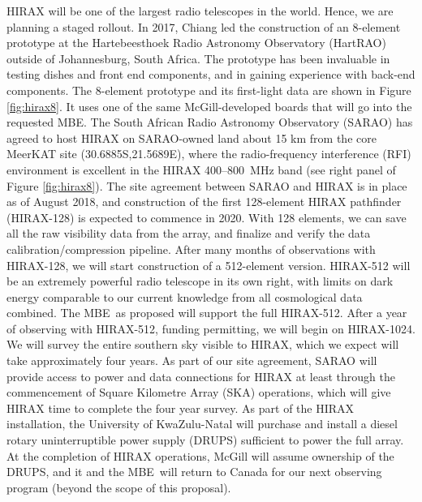 \documentclass[letterpaper,11pt,preprint]{aastex}
\newcommand{\mbe}{{\rm MBE}}
\begin{document}
HIRAX will be one of the largest radio telescopes in the world.
Hence, we are planning a staged rollout.  In 2017, Chiang led the
construction of an 8-element prototype at the Hartebeesthoek Radio
Astronomy Observatory (HartRAO) outside of Johannesburg, South Africa.
The prototype has been invaluable in testing dishes and front end
components, and in gaining experience with back-end components.  The
8-element prototype and its first-light data are shown in Figure
\ref{fig:hirax8}.  It uses one of the same McGill-developed boards
that will go into the requested \mbe.  The South African Radio
Astronomy Observatory (SARAO) has agreed to host HIRAX on SARAO-owned
land about 15 km from the core MeerKAT site (30.6885S,21.5689E), where
the radio-frequency interference (RFI) environment is excellent in the
HIRAX 400--800~MHz band (see right panel of Figure
\ref{fig:hirax8}). {\color{red} The site agreement between SARAO and
  HIRAX is in place as of August 2018, and construction of the first
  128-element HIRAX pathfinder (HIRAX-128) is expected to commence in
  2020.}  With 128 elements, we can save all the raw visibility data
from the array, and finalize and verify the data
calibration/compression pipeline. After many months of observations
with HIRAX-128, we will start construction of a 512-element version.
HIRAX-512 will be an extremely powerful radio telescope in its own
right, with limits on dark energy comparable to our current knowledge
from all cosmological data combined.  The \mbe\ as proposed will
support the full HIRAX-512. After a year of observing with HIRAX-512,
funding permitting, we will begin on HIRAX-1024.  We will survey the
entire southern sky visible to HIRAX, which we expect will take
approximately four years.  As part of our site agreement, SARAO will
provide access to power and data connections for HIRAX at least
through the commencement of Square Kilometre Array (SKA) operations,
which will give HIRAX time to complete the four year survey.  As part
of the HIRAX installation, the University of KwaZulu-Natal will
purchase and install a diesel rotary uninterruptible power supply
(DRUPS) sufficient to power the full array.  At the completion of
HIRAX operations, McGill will assume ownership of the DRUPS, and it
and the \mbe\ will return to Canada for our next observing program
(beyond the scope of this proposal).

\end{document}
